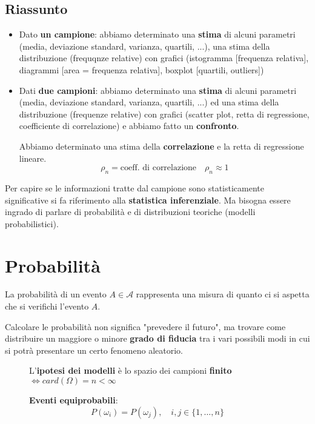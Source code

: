\documentclass[a4paper]{article}
\theoremstyle{break}
\theoremstyle{break}
\theoremstyle{break}
\theoremstyle{break}
\begin{document}
\subsection{Riassunto}
\begin{itemize}
	\item Dato \textbf{un campione}: abbiamo determinato una \textbf{stima} di alcuni
	      parametri (media, deviazione standard, varianza, quartili, ...), una stima della
	      distribuzione (frequqnze relative) con grafici (istogramma [frequenza relativa],
	      diagrammi [area = frequenza relativa], boxplot [quartili, outliers])
	\item Dati \textbf{due campioni}: abbiamo determinato una \textbf{stima} di alcuni
	      parametri (media, deviazione standard, varianza, quartili, ...) ed una stima della
	      distribuzione (frequenze relative) con grafici (scatter plot, retta di regressione,
	      coefficiente di correlazione) e abbiamo fatto un \textbf{confronto}.

	      Abbiamo determinato una stima della \textbf{correlazione} e la retta di regressione lineare.
	      \[
		      \rho_n = \text{coeff. di correlazione} \quad \rho_n \approx 1
	      \]
\end{itemize}

\noindent Per capire se le informazioni tratte dal campione sono statisticamente significative
si fa riferimento alla \textbf{statistica inferenziale}. Ma bisogna essere ingrado di
parlare di probabilità e di distribuzioni teoriche (modelli probabilistici).

\section{Probabilità}
La probabilità di un evento \( A \in \mathcal{A} \) rappresenta una misura di quanto
ci si aspetta che si verifichi l'evento \( A \).

\vspace{1em}
\noindent Calcolare le probabilità non significa "prevedere il futuro", ma trovare come
distribuire un maggiore o minore \textbf{grado di fiducia} tra i vari possibili modi
in cui si potrà presentare un certo fenomeno aleatorio.


\begin{figure}[H]
	\begin{define}
		L'\textbf{ipotesi dei modelli} è lo spazio dei campioni \textbf{finito} \( \Leftrightarrow
		card(\Omega) = n < \infty\)

		\textbf{Eventi equiprobabili}:
		\[
			P(\omega_i) = P(\omega_j), \quad i,j \in \{1, \ldots, n\}
		\]
	\end{define}
\end{figure}
\end{document}
